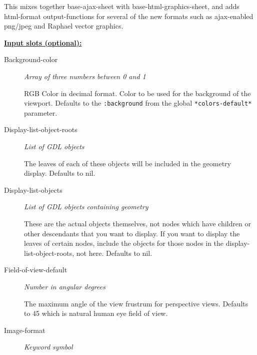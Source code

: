 \documentclass [11pt]{book}
\begin{document}
\begin{itemize}
\begin{description}
This mixes together base-ajax-sheet 
with base-html-graphics-sheet, and adds html-format output-functions 
for several of the new formats such as ajax-enabled png/jpeg and 
Raphael vector graphics.



\end{description}








\textbf{
\underline{Input slots (optional):}}

\begin{description}

\item [Background-color]
\emph{Array of three numbers between 0 and 1}

 RGB Color in decimal
format. Color to be used for the background of the viewport.
Defaults to the
\texttt{:background} from the global \texttt{*colors-default*} parameter.




\item [Display-list-object-roots]
\emph{List of GDL objects}

 The leaves of each of these objects will
be included in the geometry display. Defaults to nil.




\item [Display-list-objects]
\emph{List of GDL objects containing geometry}

 These are the
actual objects themselves, not nodes which have children or
other descendants that you want to display. If you want to
display the leaves of certain nodes, include the objects for
those nodes in the display-list-object-roots, not here.
Defaults to nil.




\item [Field-of-view-default]
\emph{Number in angular degrees}

 The maximum angle of the view frustrum
for perspective views. Defaults to 45 which is natural human eye field of view.




\item [Image-format]
\emph{Keyword symbol}


\end{description}
\end{itemize}
\end{document}
